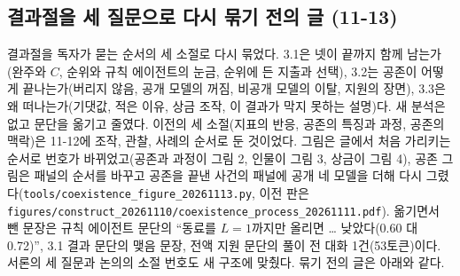 \subsection{결과절을 세 질문으로 다시 묶기 전의 글 (11-13)}\label{app:construct-moved-14}

결과절을 독자가 묻는 순서의 세 소절로 다시 묶었다. 3.1은 넷이 끝까지 함께 남는가(완주와 $C$, 순위와 규칙 에이전트의 눈금, 순위에 든 지출과 선택), 3.2는 공존이 어떻게 끝나는가(버리지 않음, 공개 모델의 꺼짐, 비공개 모델의 이탈, 지원의 장면), 3.3은 왜 떠나는가(기댓값, 적은 이유, 상금 조작, 이 결과가 막지 못하는 설명)다. 새 분석은 없고 문단을 옮기고 줄였다. 이전의 세 소절(지표의 반응, 공존의 특징과 과정, 공존의 맥락)은 11-12에 조작, 관찰, 사례의 순서로 둔 것이었다. 그림은 글에서 처음 가리키는 순서로 번호가 바뀌었고(공존과 과정이 그림 2, 인물이 그림 3, 상금이 그림 4), 공존 그림은 패널의 순서를 바꾸고 공존을 끝낸 사건의 패널에 공개 네 모델을 더해 다시 그렸다(\texttt{tools/coexistence\_figure\_20261113.py}, 이전 판은 \texttt{figures/construct\_20261110/coexistence\_process\_20261111.pdf}). 옮기면서 뺀 문장은 규칙 에이전트 문단의 ``동료를 $L=1$까지만 올리면 \ldots{} 낮았다(0.60 대 0.72)'', 3.1 결과 문단의 맺음 문장, 전액 지원 문단의 풀이 전 대화 1건(53토큰)이다. 서론의 세 질문과 논의의 소절 번호도 새 구조에 맞췄다. 묶기 전의 글은 아래와 같다.

